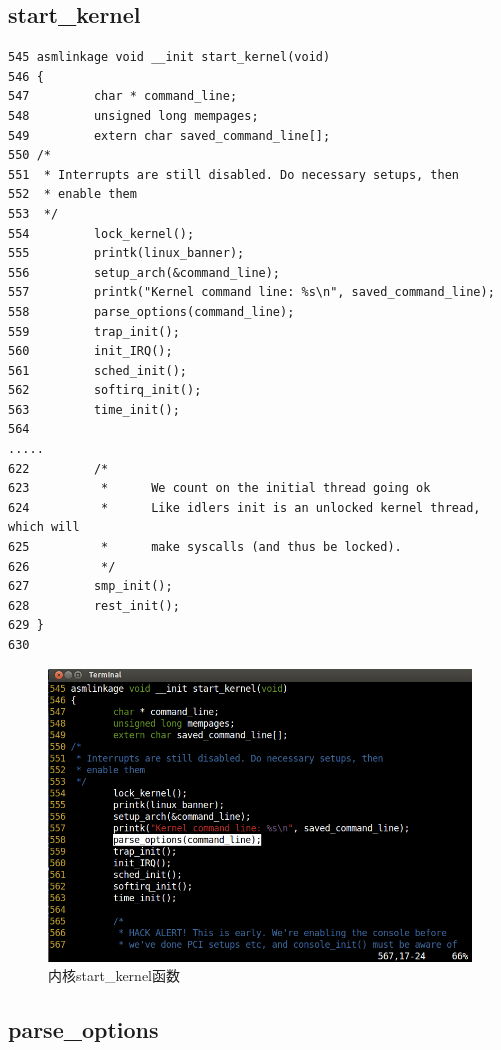 \subsection{start\_kernel}

{\begin{shaded}\begin{verbatim}
545 asmlinkage void __init start_kernel(void)
546 {
547         char * command_line;
548         unsigned long mempages;
549         extern char saved_command_line[];
550 /*
551  * Interrupts are still disabled. Do necessary setups, then
552  * enable them
553  */
554         lock_kernel();
555         printk(linux_banner);
556         setup_arch(&command_line);
557         printk("Kernel command line: %s\n", saved_command_line);
558         parse_options(command_line);
559         trap_init();
560         init_IRQ();
561         sched_init();
562         softirq_init();
563         time_init();
564 
.....
622         /* 
623          *      We count on the initial thread going ok 
624          *      Like idlers init is an unlocked kernel thread, which will
625          *      make syscalls (and thus be locked).
626          */
627         smp_init();
628         rest_init();
629 }
630 
\end{verbatim}\end{shaded}}
\begin{figure}[htbp]
\centering
\includegraphics{./pictures/start_kernel.png}
\caption{内核start\_kernel函数}
\end{figure}

\subsection{parse\_options}

